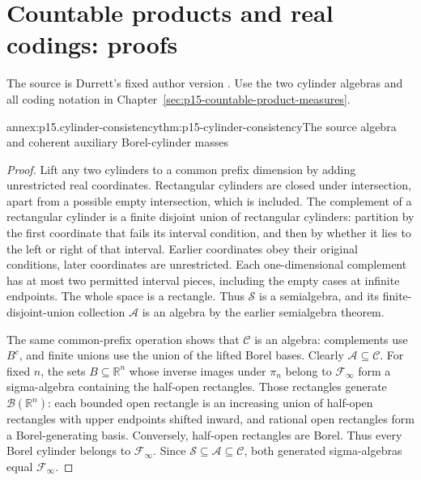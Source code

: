 \section{Countable products and real codings: proofs}
\label{sec:annex-p15-countable-product-measures}

The source is Durrett's fixed author version
\cite[pp.~53--54; app.~A.3, pp.~464--466]{DurrettPTEAuthor2019}.
Use the two cylinder algebras and all coding notation in
Chapter~\ref{sec:p15-countable-product-measures}.

\begin{annexitem}{annex:p15.cylinder-consistency}{thm:p15-cylinder-consistency}{The source algebra and coherent auxiliary Borel-cylinder masses}
\begin{proof}
Lift any two cylinders to a common prefix dimension by adding
unrestricted real coordinates. Rectangular cylinders are closed under
intersection, apart from a possible empty intersection, which is included.
The complement of a rectangular cylinder is a finite disjoint union
of rectangular cylinders: partition by the first coordinate that fails
its interval condition, and then by whether it lies to the left or
right of that interval. Earlier coordinates obey their original
conditions, later coordinates are unrestricted. Each one-dimensional
complement has at most two permitted interval pieces, including the
empty cases at infinite endpoints. The whole space is a rectangle.
Thus \(\mathcal S\) is a semialgebra, and its finite-disjoint-union
collection \(\mathcal A\) is an algebra by the earlier semialgebra
theorem.

The same common-prefix operation shows that \(\mathcal C\) is an
algebra: complements use \(B^c\), and finite unions use the union
of the lifted Borel bases. Clearly \(\mathcal A\subseteq\mathcal C\).
For fixed \(n\), the sets \(B\subseteq\mathbb R^n\) whose
inverse images under \(\pi_n\) belong to \(\mathcal F_\infty\)
form a sigma-algebra containing the half-open rectangles. Those
rectangles generate \(\mathcal B(\mathbb R^n)\): each bounded
open rectangle is an increasing union of half-open rectangles with
upper endpoints shifted inward, and rational open rectangles form
a Borel-generating basis. Conversely, half-open rectangles are Borel.
Thus every
Borel cylinder belongs to \(\mathcal F_\infty\).
Since \(\mathcal S\subseteq\mathcal A\subseteq\mathcal C\),
both generated sigma-algebras equal \(\mathcal F_\infty\).


\end{proof}
\end{annexitem}
